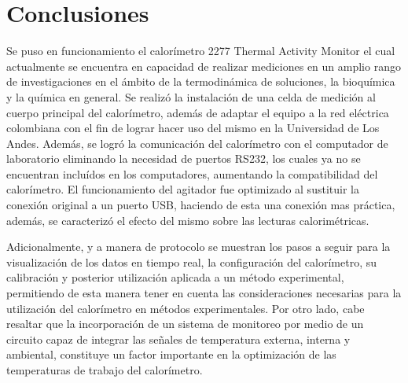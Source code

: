 
%




\chapter{Conclusiones}
Se puso en funcionamiento el calorímetro 2277 Thermal Activity Monitor el cual actualmente se encuentra en capacidad de realizar mediciones en un amplio rango de investigaciones en el ámbito de la termodinámica de soluciones, la bioqu\'imica y la qu\'imica en general. Se realiz\'o la instalaci\'on de una celda de medici\'on al cuerpo principal del calor\'imetro, adem\'as de adaptar el equipo a la red eléctrica colombiana con el fin de lograr hacer uso del mismo en la Universidad de Los Andes. Además, se logró la comunicaci\'on del calor\'imetro con el computador de laboratorio eliminando la necesidad de puertos RS232, los cuales ya no se encuentran incluídos en los computadores, aumentando la compatibilidad del calorímetro. El funcionamiento del agitador fue optimizado al sustituir la conexión original a un puerto USB, haciendo de esta una conexión mas práctica, adem\'as, se caracteriz\'o el efecto del mismo sobre las lecturas calorim\'etricas. 

Adicionalmente, y a manera de protocolo se muestran los pasos a seguir para la visualización de los datos en tiempo real, la configuración del calor\'imetro, su calibración y posterior utilización aplicada a un método experimental, permitiendo de esta manera tener en cuenta las consideraciones necesarias para la utilización del calorímetro en métodos experimentales. Por otro lado, cabe resaltar que la incorporación de un sistema de monitoreo por medio de un circuito capaz de integrar las señales de temperatura externa, interna y ambiental, constituye un factor importante en la optimización de las temperaturas de trabajo del calor\'imetro. 

